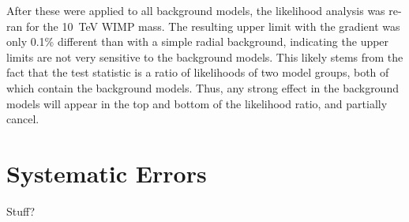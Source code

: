   After these were applied to all background models, the likelihood analysis was re-ran for the \SI{10}{\TeV} WIMP mass.
  The resulting upper limit with the gradient was only 0.1\% different than with a simple radial background, indicating the upper limits are not very sensitive to the background models.
  This likely stems from the fact that the test statistic is a ratio of likelihoods of two model groups, both of which contain the background models.
  Thus, any strong effect in the background models will appear in the top and bottom of the likelihood ratio, and partially cancel.
  
  
  
  

\section{Systematic Errors}  

Stuff?



